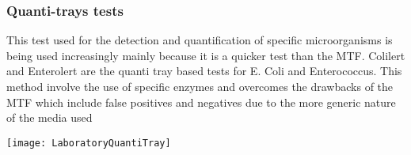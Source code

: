\subsubsection{Quanti-trays tests}

This test used for the detection and quantification of specific microorganisms is being used increasingly mainly because it is a quicker test than the MTF.  Colilert and Enterolert are the quanti tray based tests for E. Coli and Enterococcus.  This method involve the use of specific enzymes and overcomes the drawbacks of the MTF which include false positives and negatives due to the more generic nature of the media used
\begin{center}
\texttt{[image: LaboratoryQuantiTray]}
\end{center}



